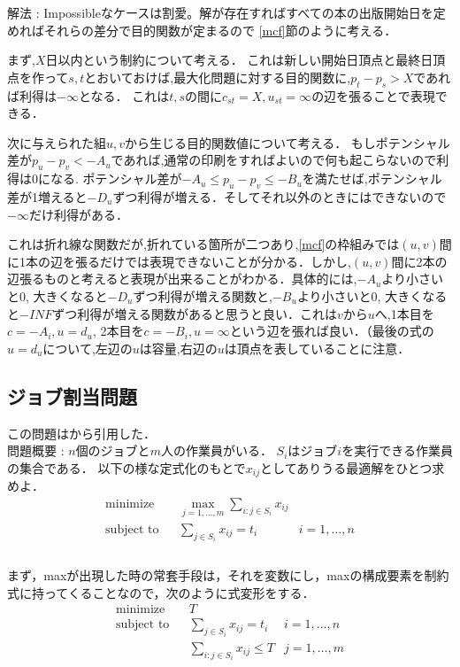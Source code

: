 \documentclass[13pt]{jarticle}
\theoremstyle{nonitalic} %
\begin{document}
解法 : 
Impossibleなケースは割愛。解が存在すればすべての本の出版開始日を定めればそれらの差分で目的関数が定まるので \ref{mcf}節のように考える．

まず,$X$日以内という制約について考える．
これは新しい開始日頂点と最終日頂点を作って$s,t$とおいておけば,最大化問題に対する目的関数に,$p_t - p_s > X $であれば利得は$- \infty$となる．
これは$t,s$の間に$c_{st} = X, u_{st}=\infty$の辺を張ることで表現できる．

次に与えられた組$u,v$から生じる目的関数値について考える．
もしポテンシャル差が$p_u - p_v < -A_u$であれば,通常の印刷をすればよいので何も起こらないので利得は0になる. ポテンシャル差が$-A_u \leq p_u - p_v \leq  -B_u$を満たせば,ポテンシャル差が1増えると$-D_u$ずつ利得が増える．そしてそれ以外のときにはできないので$-\infty$だけ利得がある．

これは折れ線な関数だが,折れている箇所が二つあり,\ref{mcf}の枠組みでは$(u,v)$間に1本の辺を張るだけでは表現できないことが分かる．しかし,$(u,v)$間に2本の辺張るものと考えると表現が出来ることがわかる．具体的には,$-A_u$より小さいと0, 大きくなると$-D_u$ずつ利得が増える関数と,$-B_u$より小さいと0, 大きくなると$-INF$ずつ利得が増える関数があると思うと良い．これは$v$から$u$へ,1本目を$c = -A_i, u=d_u$, 2本目を$c=-B_i, u=\infty$という辺を張れば良い．（最後の式の$u=d_u$について,左辺の$u$は容量,右辺の$u$は頂点を表していることに注意．


\subsection{ジョブ割当問題}
この問題は\cite{combopt}から引用した．\\

問題概要 : $n$個のジョブと$m$人の作業員がいる．
$S_i$はジョブ$i$を実行できる作業員の集合である．
以下の様な定式化のもとで$x_{ij}$としてありうる最適解をひとつ求めよ．
\begin{align}
  &&&&& \textrm{minimize}   && \max_{j=1,\dots,m} \sum_{i:j \in S_i} x_{ij} \\
  &&&&& \textrm{subject to} && \sum_{j \in S_i} x_{ij} = t_i  & i=1,\dots,n &&&&&\\
\end{align}\\


まず，maxが出現した時の常套手段は，それを変数にし，maxの構成要素を制約式に持ってくることなので，次のように式変形をする．
\begin{align}
  &&&&& \textrm{minimize}   && T \\
  &&&&& \textrm{subject to} && \sum_{j \in S_i} x_{ij} = t_i  & i=1,\dots,n &&&&&\\
  &&&&&                     &&  \sum_{i:j \in S_i} x_{ij} \leq T & j=1,\dots,m
\end{align}
\end{document}
